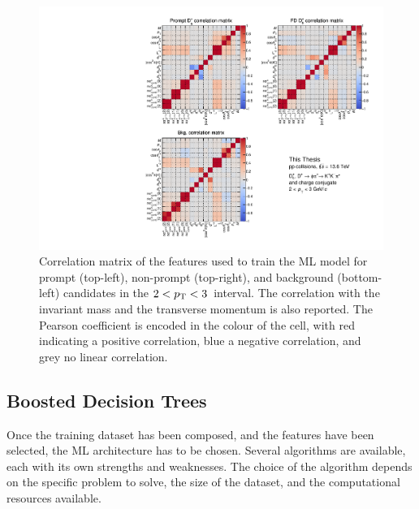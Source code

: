 \begin{figure}[p]
    \centering
    \includegraphics[width=\textwidth]{Figures/Chapter 5/CorrelationMatrix.pdf}
    \caption{Correlation matrix of the features used to train the ML model for prompt \ds (top-left), non-prompt \ds (top-right), and background (bottom-left) candidates in the $2<p_\mathrm{T}<3$~\gevc interval. The correlation with the invariant mass and the transverse momentum is also reported. The Pearson coefficient is encoded in the colour of the cell, with red indicating a positive correlation, blue a negative correlation, and grey no linear correlation.}
    \label{fig:ml_training_vars}
\end{figure}

\subsection{Boosted Decision Trees}
Once the training dataset has been composed, and the features have been selected, the ML architecture has to be chosen. Several algorithms are available, each with its own strengths and weaknesses. The choice of the algorithm depends on the specific problem to solve, the size of the dataset, and the computational resources available. 

